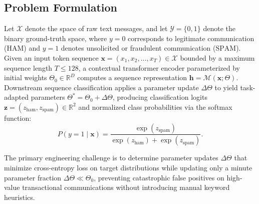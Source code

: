 \documentclass[conference]{IEEEtran}
\begin{document}
\subsection{Problem Formulation}
Let $\mathcal{X}$ denote the space of raw text messages, and let $\mathcal{Y} = \{0, 1\}$ denote the binary ground-truth space, where $y=0$ corresponds to legitimate communication ($\text{HAM}$) and $y=1$ denotes unsolicited or fraudulent communication ($\text{SPAM}$). Given an input token sequence $\mathbf{x} = (x_1, x_2, \dots, x_T) \in \mathcal{X}$ bounded by a maximum sequence length $T \le 128$, a contextual transformer encoder parameterized by initial weights $\Theta_0 \in \mathbb{R}^D$ computes a sequence representation $\mathbf{h} = \mathcal{M}(\mathbf{x}; \Theta)$. Downstream sequence classification applies a parameter update $\Delta \Theta$ to yield task-adapted parameters $\Theta^* = \Theta_0 + \Delta \Theta$, producing classification logits $\mathbf{z} = (z_{\text{ham}}, z_{\text{spam}}) \in \mathbb{R}^2$ and normalized class probabilities via the softmax function:
\begin{equation}
    P(y = 1 \mid \mathbf{x}) = \frac{\exp(z_{\text{spam}})}{\exp(z_{\text{ham}}) + \exp(z_{\text{spam}})}.
    \label{eq:softmax}
\end{equation}

The primary engineering challenge is to determine parameter updates $\Delta \Theta$ that minimize cross-entropy loss on target distributions while updating only a minute parameter fraction $\Delta \Theta \ll \Theta_0$, preventing catastrophic false positives on high-value transactional communications without introducing manual keyword heuristics.
\end{document}
